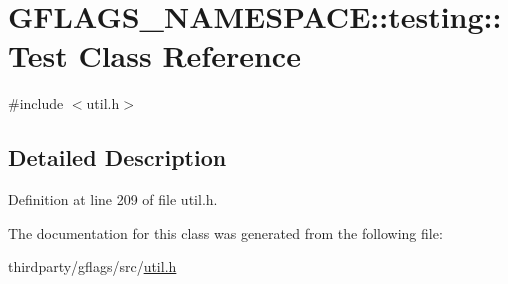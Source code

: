\hypertarget{classGFLAGS__NAMESPACE_1_1testing_1_1Test}{}\section{G\+F\+L\+A\+G\+S\+\_\+\+N\+A\+M\+E\+S\+P\+A\+CE\+:\+:testing\+:\+:Test Class Reference}
\label{classGFLAGS__NAMESPACE_1_1testing_1_1Test}


{\ttfamily \#include $<$util.\+h$>$}



\subsection{Detailed Description}


Definition at line 209 of file util.\+h.



The documentation for this class was generated from the following file\+:\begin{DoxyCompactItemize}
\item 
thirdparty/gflags/src/\hyperlink{util_8h}{util.\+h}\end{DoxyCompactItemize}
